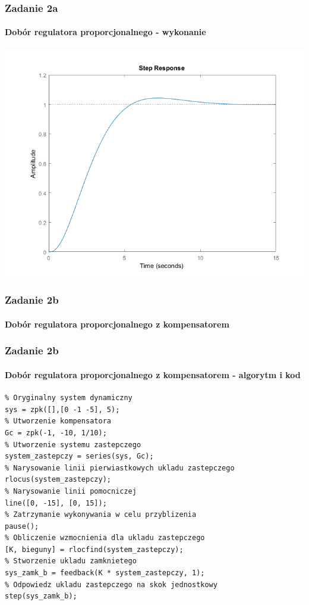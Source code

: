 \documentclass{beamer}
\begin{document}
\begin{frame}\frametitle{Zadanie 2a}\framesubtitle{Dobór regulatora proporcjonalnego - wykonanie}
\centering	\includegraphics[scale=0.5]{a-sys-zamk.png}
\end{frame}


\begin{frame}\frametitle{Zadanie 2b}\framesubtitle{Dobór regulatora proporcjonalnego z kompensatorem}
	\begin{enumerate}[b)]
		
	\end{enumerate}
\end{frame}

\begin{frame}[fragile]\frametitle{Zadanie 2b}\framesubtitle{Dobór regulatora proporcjonalnego z kompensatorem - algorytm i kod}
	\begin{lstlisting}
% Oryginalny system dynamiczny
sys = zpk([],[0 -1 -5], 5);
% Utworzenie kompensatora
Gc = zpk(-1, -10, 1/10);
% Utworzenie systemu zastepczego
system_zastepczy = series(sys, Gc);
% Narysowanie linii pierwiastkowych ukladu zastepczego
rlocus(system_zastepczy);
% Narysowanie linii pomocniczej
line([0, -15], [0, 15]);
% Zatrzymanie wykonywania w celu przyblizenia
pause();
% Obliczenie wzmocnienia dla ukladu zastepczego
[K, bieguny] = rlocfind(system_zastepczy);
% Stworzenie ukladu zamknietego
sys_zamk_b = feedback(K * system_zastepczy, 1);
% Odpowiedz ukladu zastepczego na skok jednostkowy
step(sys_zamk_b);
	\end{lstlisting}
\end{frame}
\end{document}

